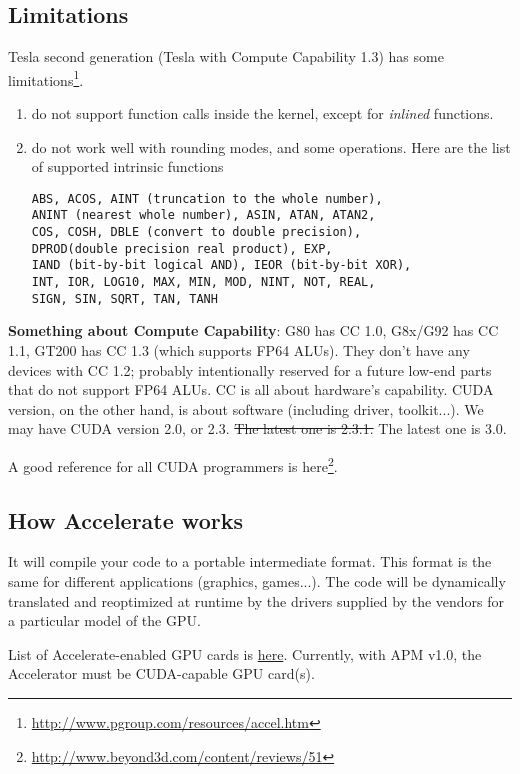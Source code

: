 \subsection{Limitations}
\label{sec:limitations}

Tesla second generation (Tesla with Compute Capability 1.3) has some
limitations\footnote{\url{http://www.pgroup.com/resources/accel.htm}}.
\begin{enumerate}
\item do not support function calls inside the kernel, except for
  {\it inlined} functions. 
\item do not work well with rounding modes, and some operations.
Here are the list of supported intrinsic functions
\begin{verbatim}
ABS, ACOS, AINT (truncation to the whole number), 
ANINT (nearest whole number), ASIN, ATAN, ATAN2, 
COS, COSH, DBLE (convert to double precision), 
DPROD(double precision real product), EXP, 
IAND (bit-by-bit logical AND), IEOR (bit-by-bit XOR), 
INT, IOR, LOG10, MAX, MIN, MOD, NINT, NOT, REAL, 
SIGN, SIN, SQRT, TAN, TANH
\end{verbatim}
\end{enumerate}

{\bf Something about Compute Capability}: G80 has CC 1.0, G8x/G92 has
CC 1.1, GT200 has CC 1.3 (which supports FP64 ALUs). They don't have
any devices with CC 1.2; probably intentionally reserved for a future
low-end parts that do not support FP64 ALUs. CC is all about
hardware's capability. CUDA version, on the other hand, is about
software (including driver, toolkit...). We may have CUDA version 2.0,
or 2.3. \sout{The latest one is 2.3.1.} The latest one is 3.0.

A good reference for all CUDA programmers is
here\footnote{\url{http://www.beyond3d.com/content/reviews/51}}. 

\subsection{How Accelerate works}
\label{sec:how-accelerate-works}

It will compile your code to a portable intermediate format. This
format is the same for different applications (graphics,
games...). The code will be dynamically translated and reoptimized at
runtime by the drivers supplied by the vendors for a particular model
of the GPU.

List of Accelerate-enabled GPU cards is
\hyperref[http://www.nvidia.com/object/cuda_learn_products.html]{here}. Currently,
with APM v1.0, the Accelerator must be CUDA-capable GPU card(s).

